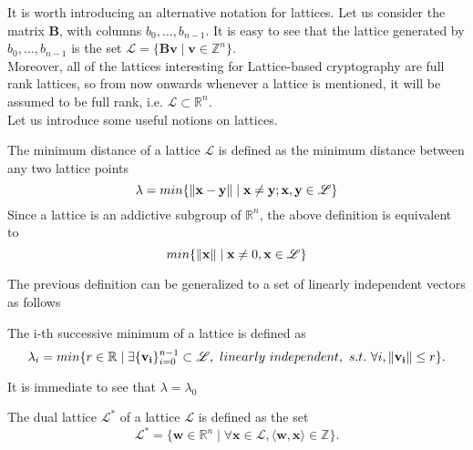 It is worth introducing an alternative notation for lattices. Let us consider the matrix $\mathbf{B}$, with columns $b_0,\ldots,b_{n-1}$. It is easy to see that the lattice generated by $b_0,\ldots,b_{n-1}$ is the set $\mathscr{L}=\{\mathbf{Bv}\mid\mathbf{v}\in\mathbb{Z}^n\}$.\\
Moreover, all of the lattices interesting for Lattice-based cryptography are full rank lattices, so from now onwards whenever a lattice is mentioned, it will be assumed to be full rank, i.e. $\mathscr{L}\subset\mathbb{R}^n$.\\
Let us introduce some useful notions on lattices.

\begin{definition}
The minimum distance of a lattice $\mathscr{L}$ is defined as the minimum distance between any two lattice points
\begin{equation*}
\lambda = min\{\left\lVert \mathbf{x}-\mathbf{y} \right\rVert\mid\mathbf{x}\ne \mathbf{y}; \mathbf{x},\mathbf{y}\in\mathscr{L}\}
\end{equation*}
Since a lattice is an addictive subgroup of $\mathbb{R}^n$, the above definition is equivalent to
\begin{equation*}
min\{\left\lVert \mathbf{x} \right\rVert\mid\mathbf{x}\ne0, \mathbf{x}\in\mathscr{L}\}
\end{equation*}
\end{definition}

The previous definition can be generalized to a set of linearly independent vectors as follows
\begin{definition}
The i-th successive minimum of a lattice is defined as 
\begin{equation*}
\lambda_i = min\{r \in \mathbb{R}\mid\exists \{\mathbf{v_i}\}_{i=0}^{n-1} \subset \mathscr{L},\text{ }linearly\text{ }independent,\text{ }s.t.\text{ }\forall i,\left\lVert \mathbf{v_i} \right\rVert\leq r\}.
\end{equation*}
\end{definition}

\begin{remark}
It is immediate to see that $\lambda=\lambda_0$
\end{remark}

\begin{definition}
The dual lattice $\mathscr{L}^*$ of a lattice $\mathscr{L}$ is defined as the set
\begin{equation*}
\mathscr{L}^*=\{\mathbf{w}\in\mathbb{R}^n\mid\forall\mathbf{x}\in\mathscr{L},\langle\mathbf{w},\mathbf{x}\rangle\in\mathbb{Z}\}.
\end{equation*}
\end{definition} 

